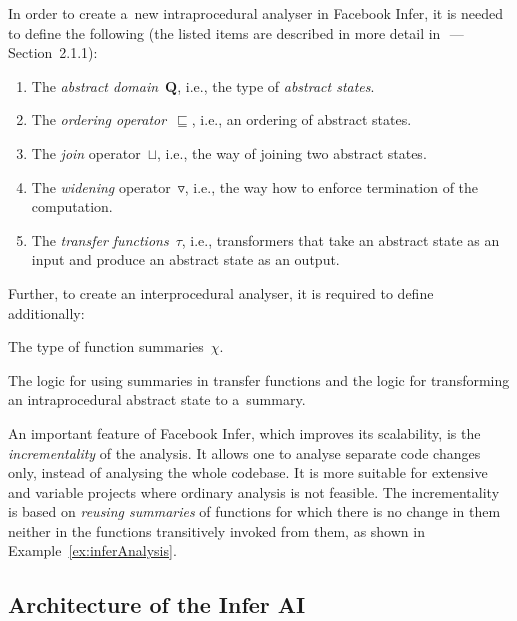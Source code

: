 \documentclass{ExcelAtFIT}
\theoremstyle{definition}
\begin{document}
In order to create a~new intraprocedural analyser in Facebook Infer, it is needed to define the following (the listed items are described in more detail in~\cite{harmimBP}\,---\,Section~2.1.1):
\begin{enumerate}
    \item The \emph{abstract domain}~$ \boldsymbol{Q} $, i.e., the type of \emph{abstract states}.

    \item The \emph{ordering operator}~$ \sqsubseteq $, i.e., an ordering of abstract states.

    \item The \emph{join} operator~$ \sqcup $, i.e., the way of joining two abstract states.

    \item The \emph{widening} operator~$ \triangledown $, i.e., the way how to enforce termination of the computation.

    \item The \emph{transfer functions}~$ \tau $, i.e., transformers that take an abstract state as an input and produce an abstract state as an output.
\end{enumerate}
Further, to create an interprocedural analyser, it is required to define additionally:
\begin{enuminline}
    \item The type of function summaries~$ \chi $.

    \item The logic for using summaries in transfer functions and the logic for transforming an intraprocedural abstract state to a~summary.
\end{enuminline}

An important feature of Facebook Infer, which improves its scalability, is the \emph{incrementality} of the analysis. It allows one to analyse separate code changes only, instead of analysing the whole codebase. It is more suitable for extensive and variable projects where ordinary analysis is not feasible. The incrementality is based on \emph{reusing summaries} of functions for which there is no change in them neither in the functions transitively invoked from them, as shown in Example~\ref{ex:inferAnalysis}.

\subsection{Architecture of the Infer AI}
\label{sec:fbinferArch}
\end{document}
